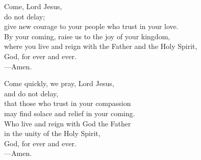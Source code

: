 \prayer


\begin{prayerverse}
Come, Lord Jesus,\\
do not delay;\\
give new courage to your people who trust in your love.\\
By your coming, raise us to the joy of your kingdom,\\
where you live and reign with the Father and the Holy Spirit,\\
God, for ever and ever.\\
{\color{red}---\thinspace}Amen.
\end{prayerverse}


\begin{prayerverse}
Come quickly, we pray, Lord Jesus,\\
and do not delay,\\
that those who trust in your compassion\\
may find solace and relief in your coming.\\
Who live and reign with God the Father\\
in the unity of the Holy Spirit,\\
God, for ever and ever.\\
{\color{red}---\thinspace}Amen.

\end{prayerverse}

